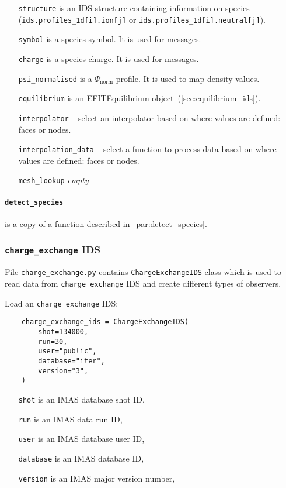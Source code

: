 \documentclass[../../main.tex]{subfiles}
\begin{document}
\begin{itemize}[align=left]
    \item[\texttt{structure}] is an IDS structure containing information on species (\texttt{ids.profiles\_1d[i].ion[j]} or \texttt{ids.profiles\_1d[i].neutral[j]}).
    \item[\texttt{symbol}] is a species symbol. It is used for messages.
    \item[\texttt{charge}] is a species charge. It is used for messages.
    \item[\texttt{psi\_normalised}] is a $\Psi_\text{norm}$ profile. It is used to map density values.
    \item[\texttt{equilibrium}] is an EFITEquilibrium object~(\cref{sec:equilibrium_ids}).
    \item[\texttt{interpolator}] -- select an interpolator based on where values are defined: faces or nodes.
    \item[\texttt{interpolation\_data}] -- select a function to process data based on where values are defined: faces or nodes.
    \item[\texttt{mesh\_lookup}] \emph{empty}
\end{itemize}

\paragraph{\texttt{detect\_species}} is a copy of a function described in~\cref{par:detect_species}.

\subsubsection{\texttt{charge\_exchange} IDS}%
\label{sec:charge_exchange_ids}

File \texttt{charge\_exchange.py} contains \texttt{ChargeExchangeIDS} class which is used to read data from \texttt{charge\_exchange} IDS and create different types of observers.

Load an \texttt{charge\_exchange} IDS:
\begin{verbatim}
    charge_exchange_ids = ChargeExchangeIDS(
        shot=134000,
        run=30,
        user="public",
        database="iter",
        version="3",
    )
\end{verbatim}

\begin{itemize}[align=left]
    \item[\texttt{shot}] is an IMAS database shot ID,
    \item[\texttt{run}] is an IMAS data run ID,
    \item[\texttt{user}] is an IMAS database user ID,
    \item[\texttt{database}] is an IMAS database ID,
    \item[\texttt{version}] is an IMAS major version number,
\end{itemize}
\end{document}

